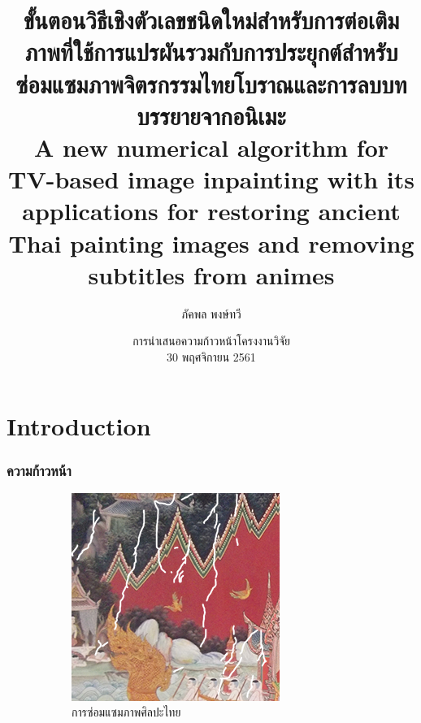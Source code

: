 \documentclass[xcolor=dvipsnames, xetex,serif]{beamer}
\title[วิธีเชิงตัวเลขสำหรับต่อเติมภาพ]{\normalsize{ขั้นตอนวิธีเชิงตัวเลขชนิดใหม่สำหรับการต่อเติมภาพที่ใช้การแปรผันรวมกับการประยุกต์สำหรับซ่อมแซมภาพจิตรกรรมไทยโบราณและการลบบทบรรยายจากอนิเมะ\\A new numerical algorithm for TV-based image inpainting with its applications for restoring ancient Thai painting images and removing subtitles from animes}}
\author[ภัคพล]{ภัคพล พงษ์ทวี}
\institute[SU]{
 	ภาควิชาคณิตศาสตร์\\
 	มหาวิทยาลัยศิลปากร \\}
\date[Project Progression]{การนำเสนอความก้าวหน้าโครงงานวิจัย\\
 	30 พฤศจิกายน 2561}
\numberwithin{equation}{section}
\begin{document}
 		\begin{frame}
 			\titlepage 
 		\end{frame}
 		
 		\section{Introduction}		
		\begin{frame}
			\frametitle{ความก้าวหน้า}
			\begin{figure}[H]
				\centering
				\begin{subfigure}{0.4\linewidth}
					\centering
					\includegraphics[width=0.8\linewidth]{images/thaiart/case01-toinpaint.png}
					\caption*{{\large การซ่อมแซมภาพศิลปะไทย}}
				\end{subfigure}
				\begin{subfigure}{0.4\linewidth}
					\centering

\end{subfigure}
\end{figure}
\end{frame}
\end{document}
